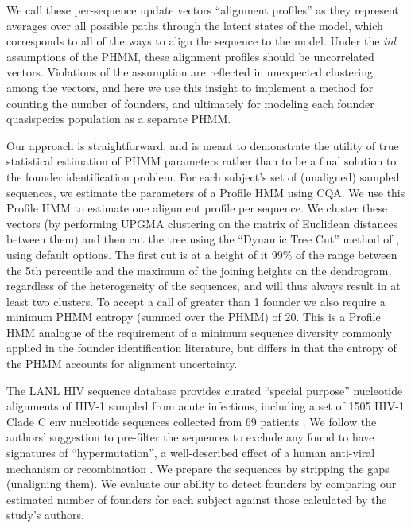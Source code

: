 \documentclass[preprint,12pt,authoryear]{elsarticle}
\begin{document}
We call these per-sequence update vectors ``alignment profiles'' as they represent averages over all possible paths through the latent states of the model, which corresponds to all of the ways to align the sequence to the model.  Under the \textit{iid} assumptions of the PHMM, these alignment profiles should be uncorrelated vectors.  Violations of the assumption are reflected in unexpected clustering among the vectors, and here we use this insight to implement a method for counting the number of founders, and ultimately for modeling each founder quasispecies population as a separate PHMM.

Our approach is straightforward, and is meant to demonstrate the utility of true statistical estimation of PHMM parameters rather than to be a final solution to the founder identification problem.  For each subject's set of (unaligned) sampled sequences, we estimate the parameters of a Profile HMM using CQA.  We use this Profile HMM to estimate one alignment profile per sequence.  We cluster these vectors (by performing UPGMA clustering on the matrix of Euclidean distances between them) and then cut the tree using the ``Dynamic Tree Cut'' method of \cite{Langfelder01032008}, using default options.  The first cut is at a height of it 99\% of the range between the 5th percentile and the maximum of the joining heights on the dendrogram, regardless of the heterogeneity of the sequences, and will thus always result in at least two clusters.  To accept a call of greater than 1 founder we also require a minimum PHMM entropy (summed over the PHMM) of 20. This is a Profile HMM analogue of the requirement of a minimum sequence diversity commonly applied in the founder identification literature, but differs in that the entropy of the PHMM accounts for alignment uncertainty.


The LANL HIV sequence database \citep[url: ][]{LANL} provides curated ``special purpose'' nucleotide alignments of HIV-1 sampled from acute infections, including a set of 1505 HIV-1 Clade C env nucleotide sequences collected from 69 patients \citep[described in][]{Abrahams:2009aa}. We follow the authors' suggestion to pre-filter the sequences to exclude any found to have signatures of ``hypermutation'', a well-described effect of a human anti-viral mechanism \citep[we use][]{rose2000detecting} or recombination \citep[using RAPBeta, url:][]{RAPBeta}. We prepare the sequences by stripping the gaps (unaligning them).  We evaluate our ability to detect founders by comparing our estimated number of founders for each subject against those calculated by the study's authors.
\end{document}
